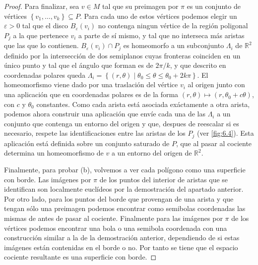 \documentclass[10pt]{report}
\newcommand{\R}{\mathbb{R}}
\theoremstyle{definition}
\begin{document}
\begin{proof}
Para finalizar, sea $v\in M$ tal que su preimagen por $\pi$ es un conjunto de vértices $\left\{v_1,\dots ,v_k\right\} \subseteq P$. Para cada uno de estos vértices podemos elegir un $\varepsilon>0$ tal que el disco $B_{\varepsilon}(v_i)$ no contenga ningun vértice de la región poligonal $P_j$ a la que pertenece $v_i$ a parte de sí mismo, y tal que no interseca más aristas que las que lo contienen. $B_{\varepsilon}(v_i)\cap P_j$ es homeomorfo a un subconjunto $\Lambda_i$ de $\R^2$ definido por la intersección de dos semiplanos cuyas fronteras coinciden en un único punto y tal que el ángulo que forman es de $2\pi /k$, y que descrito en coordenadas polares queda $\Lambda_i =\left\{ (r,\theta ) \mid \theta_0 \leq \theta \leq \theta_0 + 2k\pi \right\}$. El homeomorfismo viene dado por una traslación del vértice $v_i$ al origen junto con una aplicación que en coordenadas polares es de la forma $(r,\theta ) \mapsto (r,\theta_0 +c\theta )$, con $c$ y $\theta_0$ constantes. Como cada arista está asociada exáctamente a otra arista, podemos ahora construir una aplicación que envíe cada una de las $\Lambda_i$ a un conjunto que contenga un entorno del origen y que, despues de reescalar si es necesario, respete las identificaciones entre las aristas de los $P_j$ (ver \autoref{fig:6.4}). Esta aplicación está definida sobre un conjunto saturado de $P$, que al pasar al cociente determina un homeomorfismo de $v$ a un entorno del origen de $\R^2$. %

Finalmente, para probar (b), volvemos a ver cada polígono como una superficie con borde. Las imágenes por $\pi$ de los puntos del interior de aristas que se identifican son localmente euclídeos por la demostración del apartado anterior. Por otro lado, para los puntos del borde que provengan de una arista y que tengan sólo una preimagen podemos encontrar como semibolas coordenadas las mismas de antes de pasar al cociente. Finalmente para las imágenes por $\pi$ de los vértices podemos encontrar una bola o una semibola coordenada con una construcción similar a la de la demostración anterior, dependiendo de si estas imágenes están contenidas en el borde o no. Por tanto se tiene que el espacio cociente resultante es una superficie con borde. %
\end{proof}
\end{document}
